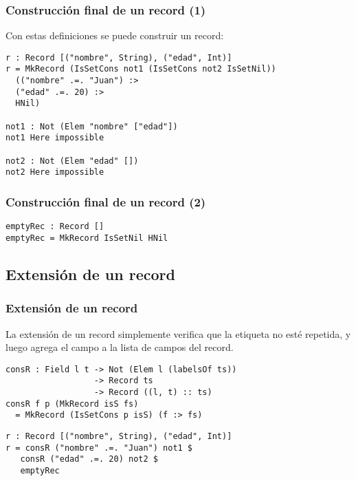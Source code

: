 \documentclass{beamer}
\begin{document}
\begin{frame}[fragile]
\frametitle{Construcción final de un record (1)}

Con estas definiciones se puede construir un record:

\begin{example}
\begin{verbatim}
r : Record [("nombre", String), ("edad", Int)]
r = MkRecord (IsSetCons not1 (IsSetCons not2 IsSetNil)) 
  (("nombre" .=. "Juan") :>
  ("edad" .=. 20) :>
  HNil)

not1 : Not (Elem "nombre" ["edad"])
not1 Here impossible

not2 : Not (Elem "edad" [])
not2 Here impossible
\end{verbatim}
\end{example}
\end{frame}

\begin{frame}[fragile]
\frametitle{Construcción final de un record (2)}

\begin{example}
\begin{verbatim}
emptyRec : Record []
emptyRec = MkRecord IsSetNil HNil
\end{verbatim}
\end{example}

\end{frame}

\subsection{Extensión de un record}

\begin{frame}[fragile]
\frametitle{Extensión de un record}

La extensión de un record simplemente verifica que la etiqueta no esté repetida, y luego agrega el campo a la lista de campos del record.

\pause

\begin{example}
\begin{verbatim}
consR : Field l t -> Not (Elem l (labelsOf ts))
                  -> Record ts
                  -> Record ((l, t) :: ts)
consR f p (MkRecord isS fs)
  = MkRecord (IsSetCons p isS) (f :> fs)
\end{verbatim}
\end{example}

\pause
\begin{example}
\begin{verbatim}
r : Record [("nombre", String), ("edad", Int)]
r = consR ("nombre" .=. "Juan") not1 $
   consR ("edad" .=. 20) not2 $
   emptyRec
\end{verbatim}
\end{example}
\end{frame}
\end{document}

